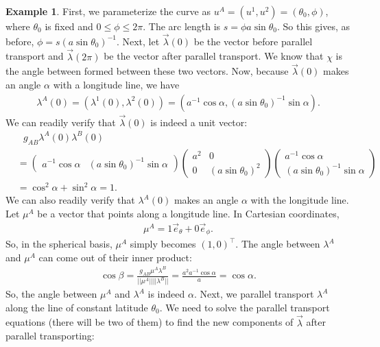\documentclass{book}
\theoremstyle{definition}
\newtheorem{exmp}{Example}[section]
\begin{document}
\begin{exmp}
	First, we parameterize the curve as $u^A = (u^1,u^2) = (\theta_0, \phi)$, where $\theta_0$ is fixed and $0 \leq \phi \leq 2\pi$. The arc length is $s = \phi a\sin\theta_0$. So this gives, as before, $\phi = s\left(a\sin\theta_0 \right)^{-1}$. Next, let $\vec{\lambda}(0)$ be the vector before parallel transport and $\vec{\lambda}(2\pi)$ be the vector after parallel transport. We know that $\chi$ is the angle between formed between these two vectors. Now, because $\vec{\lambda}(0)$ makes an angle $\alpha$ with a longitude line, we have
	\begin{align*}
	\lambda^A(0) = \left( \lambda^1(0),\lambda^2(0)\right) = \left(a^{-1}\cos\alpha, \left( a\sin\theta_0\right)^{-1}\sin\alpha  \right).
	\end{align*}
	We can readily verify that $\vec{\lambda}(0)$ is indeed a unit vector:
	\begin{align*}
	&\text{ }g_{AB}\lambda^A(0)\lambda^B(0)\\
	 &= 
	\begin{pmatrix}
	a^{-1}\cos\alpha & \left(a\sin\theta_0 \right)^{-1}\sin\alpha 
	\end{pmatrix}
	\begin{pmatrix}
	a^2 & 0\\
	0 & \left(a\sin\theta_0 \right)^2 
	\end{pmatrix}
	\begin{pmatrix}
	a^{-1}\cos\alpha\\
	\left( a\sin\theta_0\right)^{-1}\sin\alpha 
	\end{pmatrix}\\
	&=
	\cos^2\alpha + \sin^2\alpha = 1.
	\end{align*}
	We can also readily verify that $\lambda^A(0)$ makes an angle $\alpha$ with the longitude line. Let $\mu^A$ be a vector that points along a longitude line. In Cartesian coordinates, 
	\begin{align*}
	\mu^A = 1 \vec{e}_{\theta} + 0\vec{e}_\phi.
	\end{align*} 
	So, in the spherical basis, $\mu^A$ simply becomes $(1,0)^\top$. The angle between $\lambda^A$ and $\mu^A$ can come out of their inner product:
	\begin{align*}
	\cos\beta = \frac{g_{AB}\mu^A\lambda^B}{\vert\vert \mu^A \vert\vert \vert\vert \lambda^B\vert\vert} = \frac{a^2a^{-1}\cos\alpha}{a} = \cos\alpha.
	\end{align*}
	So, the angle between $\mu^A$ and $\lambda^A$ is indeed $\alpha$. Next, we parallel transport $\lambda^A$ along the line of constant latitude $\theta_0$. We need to solve the parallel transport equations (there will be two of them) to find the new components of $\vec{\lambda}$ after parallel transporting:

\end{exmp}
\end{document}
